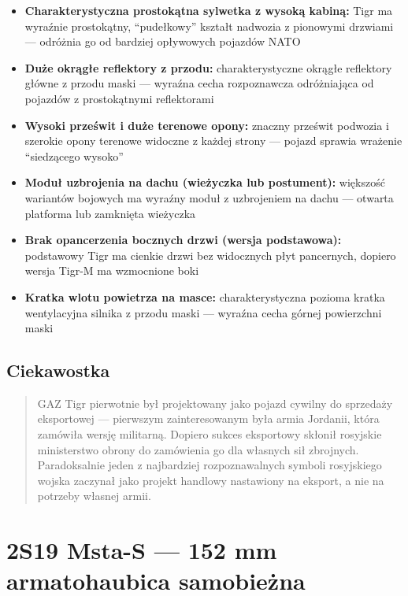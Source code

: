 \documentclass[12pt,oneside]{book}
\providecommand{\tightlist}{%
  \setlength{\itemsep}{0pt}\setlength{\parskip}{0pt}}
\begin{document}
\begin{itemize}
\tightlist
\item
  \textbf{Charakterystyczna prostokątna sylwetka z wysoką kabiną:} Tigr
  ma wyraźnie prostokątny, ``pudełkowy'' kształt nadwozia z pionowymi
  drzwiami --- odróżnia go od bardziej opływowych pojazdów NATO
\item
  \textbf{Duże okrągłe reflektory z przodu:} charakterystyczne okrągłe
  reflektory główne z przodu maski --- wyraźna cecha rozpoznawcza
  odróżniająca od pojazdów z prostokątnymi reflektorami
\item
  \textbf{Wysoki prześwit i duże terenowe opony:} znaczny prześwit
  podwozia i szerokie opony terenowe widoczne z każdej strony --- pojazd
  sprawia wrażenie ``siedzącego wysoko''
\item
  \textbf{Moduł uzbrojenia na dachu (wieżyczka lub postument):}
  większość wariantów bojowych ma wyraźny moduł z uzbrojeniem na dachu
  --- otwarta platforma lub zamknięta wieżyczka
\item
  \textbf{Brak opancerzenia bocznych drzwi (wersja podstawowa):}
  podstawowy Tigr ma cienkie drzwi bez widocznych płyt pancernych,
  dopiero wersja Tigr-M ma wzmocnione boki
\item
  \textbf{Kratka wlotu powietrza na masce:} charakterystyczna pozioma
  kratka wentylacyjna silnika z przodu maski --- wyraźna cecha górnej
  powierzchni maski
\end{itemize}

\subsection{Ciekawostka}\label{ciekawostka-17}

\begin{quote}
GAZ Tigr pierwotnie był projektowany jako pojazd cywilny do sprzedaży
eksportowej --- pierwszym zainteresowanym była armia Jordanii, która
zamówiła wersję militarną. Dopiero sukces eksportowy skłonił rosyjskie
ministerstwo obrony do zamówienia go dla własnych sił zbrojnych.
Paradoksalnie jeden z najbardziej rozpoznawalnych symboli rosyjskiego
wojska zaczynał jako projekt handlowy nastawiony na eksport, a nie na
potrzeby własnej armii.
\end{quote}

\section{2S19 Msta-S --- 152 mm armatohaubica
samobieżna}\label{s19-msta-s-152-mm-armatohaubica-samobieux17cna}
\end{document}
